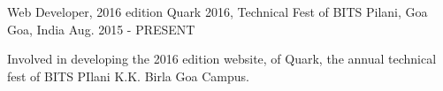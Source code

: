 
\begin{cventries}
  \cventry
    {Web Developer, 2016 edition}
    {Quark 2016, Technical Fest of BITS Pilani, Goa}
    {Goa, India}
    {Aug. 2015 - PRESENT}
    {
      \begin{cvitems}
        \item {Involved in developing the 2016 edition website, of Quark, the annual technical fest of BITS PIlani K.K. Birla Goa Campus.}
        \item {}
      \end{cvitems}
    }
  
\end{cventries}
